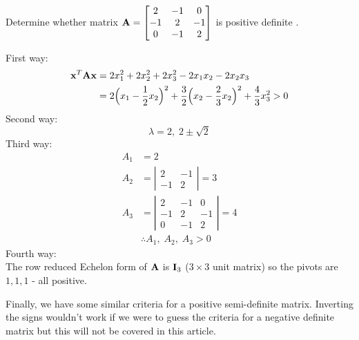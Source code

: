 \documentclass[a4paper]{article}
\numberwithin{equation}{section} %
\newcommand{\B}[1]{\textbf{\textup{#1}}} %
\begin{document}
\begin{exmp}
Determine whether matrix $\B{A}=
\begin{bmatrix}
2 & -1 & 0 \\ -1 & 2 & -1 \\0 & -1 & 2
\end{bmatrix}$
is positive definite \cite{chen_lec_notes}.
\end{exmp}

\begin{TheSolution}
First way:
\[
\begin{split}
\B{x}^{T}\B{Ax}&=2x_1^2+2x_2^2+2x_3^2-2x_{1}x_{2}-2x_{2}x_{3} \\
	&=2 \Big( x_1 - \frac{1}{2}x_2\Big)^2 + 
    \frac{3}{2}\Big( x_2 - \frac{2}{3}x_2\Big)^2 + 
    \frac{4}{3}x_3^2 > 0
\end{split}
\]
Second way:
\[
\lambda=2,\;2\pm \sqrt{2}
\]
Third way:
\[
\begin{split}
A_1 &= 2 \\
A_2&=\left| \begin{matrix} 2 & -1 \\-1 & 2\end{matrix}\right|=3 \\
A_3&=\left| \begin{matrix} 2 & -1 & 0\\-1 & 2 & -1\\ 0 & -1 & 2\end{matrix}\right|=4 \\
& \therefore A_1, \; A_2, \; A_3 > 0
\end{split}
\]
Fourth way:\\
The row reduced Echelon form of $\B{A}$ is $\B{I}_3$ ($3 \times 3$ unit matrix) so the pivots are $1,1,1$ - all positive. 


\end{TheSolution}

Finally, we have some similar criteria for a positive semi-definite matrix. Inverting the signs wouldn't work if we were to guess the criteria for a negative definite matrix but this will not be covered in this article.
\end{document}
